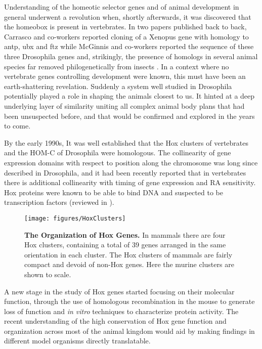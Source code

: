 Understanding of the homeotic selector genes and of animal development in general underwent a revolution when, shortly afterwards, it was discovered that the homeobox is present in vertebrates. In two papers published back to back, Carrasco and co-workers reported cloning of a Xenopus gene with homology to \ac{antp}, \ac{ubx} and \ac{ftz} \parencite{Carrasco1984} while McGinnis and co-workers reported the sequence of these three Drosophila genes and, strikingly, the presence of homologs in several animal species far removed philogenetically from insects \parencite{McGinnis1984b}. In a context where no vertebrate genes controlling development were known, this must have been an earth-shattering revelation. Suddenly a system well studied in Drosophila potentially played a role in shaping the animals closest to us. It hinted at a deep underlying layer of similarity uniting all complex animal body plans that had been unsuspected before, and that would be confirmed and explored in the years to come.



By the early 1990s, It was well established that the Hox clusters of vertebrates and the \ac{HOM-C} of Drosophila were homologous. The collinearity of gene expression domains with respect to position along the chromosome was long since described in  Drosophila, and it had been recently reported that in vertebrates there is additional collinearity with timing of gene expression and RA sensitivity. Hox proteins were known to be able to bind DNA and suspected to be transcription factors (reviewed in \textcite{Levine1988, McGinnis1992}).

\begin{figure}[]
  
  \centering
  \texttt{[image: figures/HoxClusters]}
  \caption[The Organization of Hox Genes]{\textbf{The Organization of Hox Genes.} In mammals there are four Hox clusters, containing a total of 39 genes arranged in the same orientation in each cluster. The Hox clusters of mammals are fairly compact and devoid of non-Hox genes. Here the murine clusters are shown to scale.}
  \label{fig:hoxclusters}
\end{figure}

A new stage in the study of Hox genes started focusing on their molecular function, through the use of homologous recombination in the mouse to generate loss of function and \textit{in vitro} techniques to characterize protein activity. The recent understanding of the high conservation of Hox gene function and organization across most of the animal kingdom would aid by making findings in different model organisms directly translatable. 

